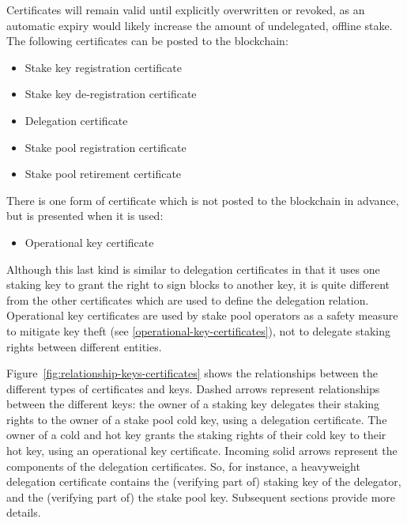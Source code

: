 \documentclass[11pt,a4paper]{article}
\begin{document}
Certificates will remain valid
until explicitly overwritten or revoked, as an automatic expiry would
likely increase the amount of undelegated, offline stake. The following
certificates can be posted to the blockchain:
\begin{itemize}
\item Stake key registration certificate
\item Stake key de-registration certificate
\item Delegation certificate
\item Stake pool registration certificate
\item Stake pool retirement certificate
\end{itemize}
There is one form of certificate which is not posted to the blockchain
in advance, but is presented when it is used:
\begin{itemize}
\item
  Operational key certificate
\end{itemize}
Although this last kind is similar to delegation certificates in that
it uses one staking key to grant the right to sign blocks to another
key, it is quite different from the other certificates which are used
to define the delegation relation. Operational key certificates are
used by stake pool operators as a safety measure to mitigate key
theft (see \cref{operational-key-certificates}), not to delegate
staking rights between different entities.

Figure~\ref{fig:relationship-keys-certificates} shows the relationships between
the different types of certificates and keys.
%
Dashed arrows represent relationships between the different keys: the owner of
a staking key delegates their staking rights to the owner of a stake pool cold
key, using a delegation certificate.
%
The owner of a cold and hot key grants the staking rights of their cold key to their
hot key, using an operational key certificate.
%
Incoming solid arrows represent the components of the delegation certificates.
So, for instance, a heavyweight delegation certificate contains the (verifying
part of) staking key of the delegator, and the (verifying part of) the stake
pool key.
%
Subsequent sections provide more details.
\end{document}
